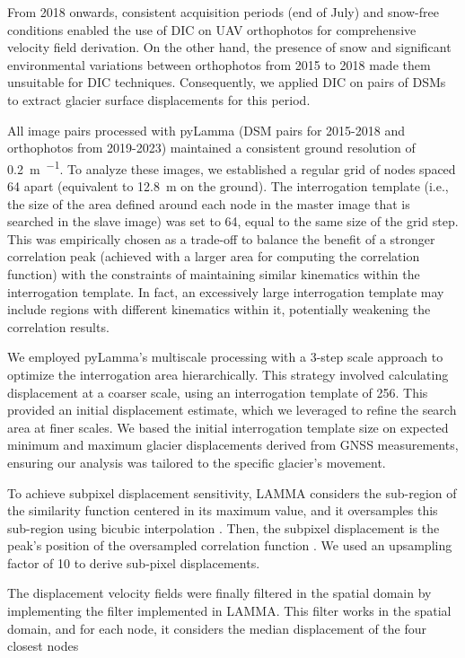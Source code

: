 From 2018 onwards, consistent acquisition periods (end of July) and snow-free conditions enabled the use of DIC on UAV orthophotos for comprehensive velocity field derivation.
On the other hand, the presence of snow and significant environmental variations between orthophotos from 2015 to 2018 made them unsuitable for DIC techniques.
Consequently, we applied DIC on pairs of DSMs \citep{Gindraux2019} to extract glacier surface displacements for this period.

All image pairs processed with pyLamma (DSM pairs for 2015-2018 and orthophotos from 2019-2023) maintained a consistent ground resolution of \SI{0.2}{\meter\per\pixel}. 
To analyze these images, we established a regular grid of nodes spaced \SI{64}{\pixel} apart (equivalent to \SI{12.8}{\meter} on the ground).
The interrogation template (i.e., the size of the area defined around each node in the master image that is searched in the slave image)
was set to \SI{64}{\pixel}, equal to the same size of the grid step.
This was empirically chosen as a trade-off to balance the benefit of a stronger correlation peak (achieved with a larger area for computing the correlation function) with the constraints of maintaining similar kinematics within the interrogation template.
In fact, an excessively large interrogation template may include regions with different kinematics within it, potentially weakening the correlation results. 

We employed pyLamma's multiscale processing with a 3-step scale approach to optimize the interrogation area hierarchically.  
This strategy involved calculating displacement at a coarser scale, using an interrogation template of \SI{256}{\pixel}. 
This provided an initial displacement estimate, which we leveraged to refine the search area at finer scales.  
We based the initial interrogation template size on expected minimum and maximum glacier displacements derived from GNSS measurements, ensuring our analysis was tailored to the specific glacier's movement.

To achieve subpixel displacement sensitivity, LAMMA considers the sub-region of the similarity function centered in its maximum value, and it oversamples this sub-region using bicubic interpolation \citep{Dematteis2022}.
Then, the subpixel displacement is the peak's position of the oversampled correlation function \citep{Debella_Gilo2011}.
We used an upsampling factor of 10 to derive sub-pixel displacements. 

The displacement velocity fields were finally filtered in the spatial domain by implementing the filter implemented in LAMMA. 
This filter works in the spatial domain, and for each node, it considers the median displacement of the four closest nodes \cite{Dematteis2024} 

